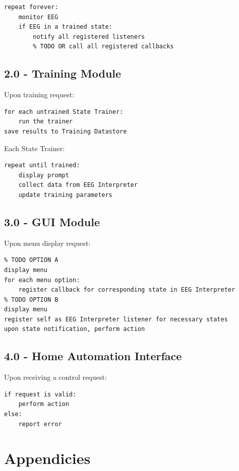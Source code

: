 \documentclass{article}
\begin{document}

\begin{lstlisting}
repeat forever:
    monitor EEG
    if EEG in a trained state:
        notify all registered listeners
        % TODO OR call all registered callbacks
\end{lstlisting}

\subsection*{2.0 - Training Module}

Upon training request:

\begin{lstlisting}
for each untrained State Trainer:
    run the trainer
save results to Training Datastore
\end{lstlisting}

Each State Trainer:

\begin{lstlisting}
repeat until trained:
    display prompt
    collect data from EEG Interpreter
    update training parameters
\end{lstlisting}

\subsection*{3.0 - GUI Module}

Upon menu display request:
\begin{lstlisting}
% TODO OPTION A
display menu
for each menu option:
    register callback for corresponding state in EEG Interpreter
% TODO OPTION B
display menu
register self as EEG Interpreter listener for necessary states
upon state notification, perform action
\end{lstlisting}

\subsection*{4.0 - Home Automation Interface}

Upon receiving a control request:

\begin{lstlisting}
if request is valid:
    perform action
else:
    report error
\end{lstlisting}

\newpage

\section{Appendicies}
\end{document}
